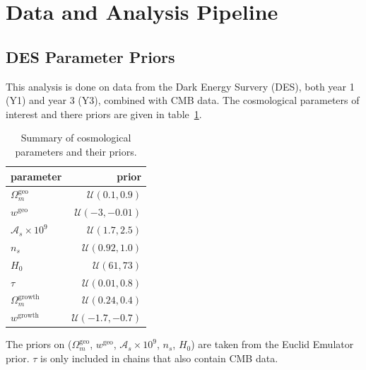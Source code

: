 \section{Data and Analysis Pipeline}
\subsection{DES Parameter Priors}
This analysis is done on data from the Dark Energy Survery (DES), both year 1 (Y1) and year 3 (Y3), combined with CMB data. The cosmological parameters of interest and there priors are given in table~\ref{table:cosmo_prior}.
\begin{table}
\centering
\begin{tabular}{lr}
	\hline
	parameter & prior \\
	\hline\hline
	$\Omega_m^{\text{geo}}$    & $\mathcal{U}(0.1,0.9)$   \\
	$w^{\mathrm{geo}}$         & $\mathcal{U}(-3,-0.01)$  \\
	$\mathcal{A}_s\times10^9$  & $\mathcal{U}(1.7,2.5)$   \\
	$n_s$                      & $\mathcal{U}(0.92,1.0)$  \\
	$H_0$                      & $\mathcal{U}(61,73)$     \\
	$\tau$                     & $\mathcal{U}(0.01,0.8)$  \\
	$\Omega_m^{\text{growth}}$ & $\mathcal{U}(0.24,0.4)$  \\
	$w^{\mathrm{growth}}$      & $\mathcal{U}(-1.7,-0.7)$ \\
	\hline
\end{tabular}
\caption{Summary of cosmological parameters and their priors.}
\label{table:cosmo_prior}
\end{table}
The priors on ($\Omega_m^{\text{geo}}$, $w^{\mathrm{geo}}$, $\mathcal{A}_s\times10^9$, $n_s$, $H_0$) are taken from the Euclid Emulator prior. $\tau$ is only included in chains that also contain CMB data.
